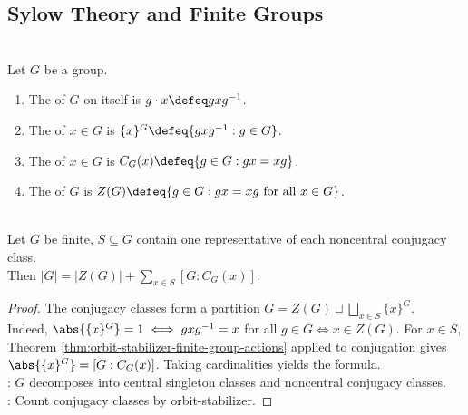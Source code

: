 \subsection{Sylow Theory and Finite Groups}

\begin{definition} \label{def:conjugacy-class-centralizer} \\
Let $G$ be a group.
\begin{enumerate}[label=(\roman*)]
\setlength{\itemsep}{0pt}
\item The  of $G$ on itself is $g\cdot x\defeq gxg^{-1}$.
\item The  of $x\in G$ is $\{x\}^{G}\defeq\{gxg^{-1}:g\in G\}$.
\item The  of $x\in G$ is $C_G(x)\defeq\{g\in G:gx=xg\}$.
\item The  of $G$ is $Z(G)\defeq\{g\in G:gx=xg\text{ for all }x\in G\}$.
\end{enumerate}
\end{definition}

\begin{theorem} \label{thm:finite-group-class-equation} \\
Let $G$ be finite, $S\subseteq G$ contain one representative of each noncentral conjugacy class.\\
Then $|G|=|Z(G)|+\sum\limits_{x\in S}[G:C_G(x)]$.
\begin{proof}
The conjugacy classes form a partition $G=Z(G)\sqcup\bigsqcup\limits_{x\in S}\{x\}^{G}$.\\
Indeed, $\abs{\{x\}^{G}}=1 \iff gxg^{-1}=x$ for all $g\in G \iff x\in Z(G)$. For $x\in S$, Theorem \ref{thm:orbit-stabilizer-finite-group-actions} applied to conjugation gives $\abs{\{x\}^{G}}=[G:C_G(x)]$. Taking cardinalities yields the formula.\\
: $G$ decomposes into central singleton classes and noncentral conjugacy classes.\\
: Count conjugacy classes by orbit-stabilizer.
\end{proof}
\end{theorem}
